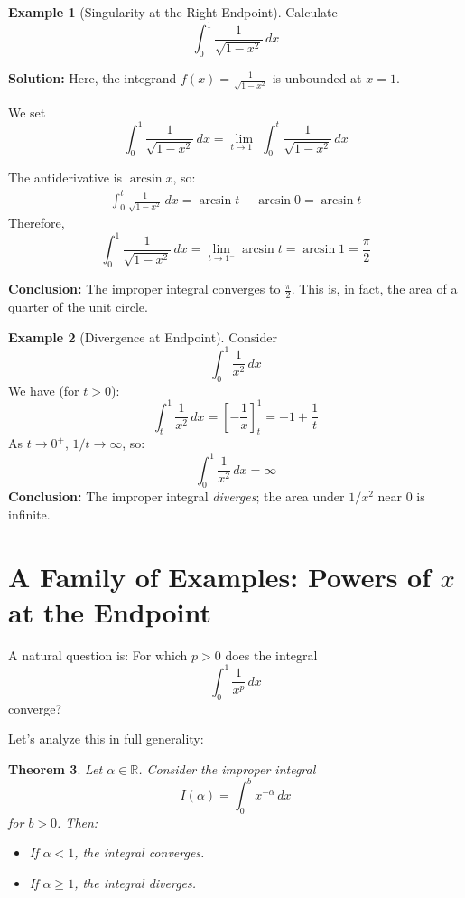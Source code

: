 \documentclass[11pt,oneside]{article}
\newtheorem{theorem}{Theorem}[section]
\theoremstyle{definition}
\newtheorem{example}[theorem]{Example}
\theoremstyle{remark}
\begin{document}
\begin{example}[Singularity at the Right Endpoint]
Calculate
\[
\int_0^1 \frac{1}{\sqrt{1-x^2}}\,dx
\]

\textbf{Solution:}
Here, the integrand $f(x) = \frac{1}{\sqrt{1-x^2}}$ is unbounded at $x=1$.

We set
\[
\int_0^1 \frac{1}{\sqrt{1-x^2}}\,dx = \lim_{t \to 1^-} \int_0^t \frac{1}{\sqrt{1-x^2}}\,dx
\]

The antiderivative is $\arcsin x$, so:
\begin{align*}
\int_0^t \frac{1}{\sqrt{1-x^2}}\,dx = \arcsin t - \arcsin 0 = \arcsin t
\end{align*}
Therefore,
\[
\int_0^1 \frac{1}{\sqrt{1-x^2}}\,dx = \lim_{t \to 1^-} \arcsin t = \arcsin 1 = \frac{\pi}{2}
\]

\textbf{Conclusion:} The improper integral converges to $\frac{\pi}{2}$. This is, in fact, the area of a quarter of the unit circle.
\end{example}

\begin{example}[Divergence at Endpoint]
Consider
\[
\int_0^1 \frac{1}{x^2}\,dx
\]
We have (for $t > 0$):
\[
\int_t^1 \frac{1}{x^2}\,dx = \left[ -\frac{1}{x} \right]_{t}^1 = -1 + \frac{1}{t}
\]
As $t \to 0^+$, $1/t \to \infty$, so:
\[
\int_0^1 \frac{1}{x^2}\,dx = \infty
\]
\textbf{Conclusion:} The improper integral \emph{diverges}; the area under $1/x^2$ near $0$ is infinite.
\end{example}

\section{A Family of Examples: Powers of $x$ at the Endpoint}\label{sec:power_examples}

A natural question is: For which $p > 0$ does the integral
\[
\int_0^1 \frac{1}{x^p}\,dx
\]
converge?

Let's analyze this in full generality:

\begin{theorem}
Let $\alpha \in \mathbb{R}$. Consider the improper integral
\[
I(\alpha) = \int_0^b x^{-\alpha}\,dx
\]
for $b > 0$. Then:
\begin{itemize}
    \item[(a)] If $\alpha < 1$, the integral converges.
    \item[(b)] If $\alpha \geq 1$, the integral diverges.
\end{itemize}
\end{theorem}
\end{document}
